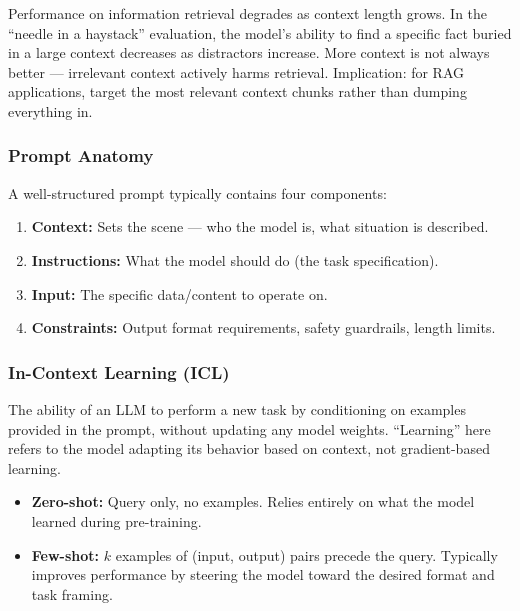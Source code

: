 \documentclass[11pt, a4paper]{article}
\begin{document}
\begin{warnbox}
Performance on information retrieval degrades as context length grows. In the ``needle in a haystack'' evaluation, the model's ability to find a specific fact buried in a large context decreases as distractors increase. More context is not always better --- irrelevant context actively harms retrieval. Implication: for RAG applications, target the most relevant context chunks rather than dumping everything in.
\end{warnbox}

\subsubsection{Prompt Anatomy}

A well-structured prompt typically contains four components:

\begin{enumerate}[leftmargin=2em]
  \item \textbf{Context:} Sets the scene --- who the model is, what situation is described.
  \item \textbf{Instructions:} What the model should do (the task specification).
  \item \textbf{Input:} The specific data/content to operate on.
  \item \textbf{Constraints:} Output format requirements, safety guardrails, length limits.
\end{enumerate}

\subsubsection{In-Context Learning (ICL)}

\begin{defbox}
The ability of an LLM to perform a new task by conditioning on examples provided in the prompt, without updating any model weights. ``Learning'' here refers to the model adapting its behavior based on context, not gradient-based learning.
\end{defbox}

\begin{itemize}[leftmargin=2em]
  \item \textbf{Zero-shot:} Query only, no examples. Relies entirely on what the model learned during pre-training.
  \item \textbf{Few-shot:} $k$ examples of (input, output) pairs precede the query. Typically improves performance by steering the model toward the desired format and task framing.
\end{itemize}
\end{document}
